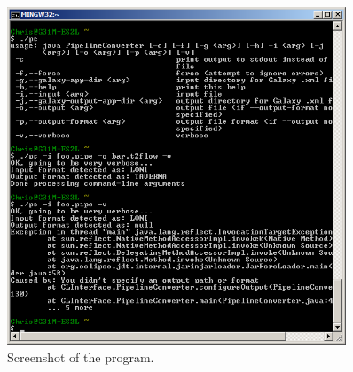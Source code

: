 \documentclass[12pt]{article}
\begin{document}
\begin{figure}[htbp]
\centering
\includegraphics[width=0.90\textwidth]{screenshot.png}
\caption{Screenshot of the program.}
\label{fig:screenshot}
\end{figure}
\end{document}
